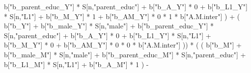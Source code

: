 \documentclass[
]{book}
\newenvironment{Shaded}{\begin{snugshade}}{\end{snugshade}}
\newcommand{\DecValTok}[1]{\textcolor[rgb]{0.00,0.00,0.81}{#1}}
\newcommand{\NormalTok}[1]{#1}
\newcommand{\SpecialCharTok}[1]{\textcolor[rgb]{0.00,0.00,0.00}{#1}}
\newcommand{\StringTok}[1]{\textcolor[rgb]{0.31,0.60,0.02}{#1}}
\begin{document}
\begin{Shaded}
\begin{Highlighting}[]
\NormalTok{                                 b[}\StringTok{"b\_parent\_educ\_Y"}\NormalTok{] }\SpecialCharTok{*}\NormalTok{ S[n,}\StringTok{"parent\_educ"}\NormalTok{] }\SpecialCharTok{+} 
\NormalTok{                                 b[}\StringTok{"b\_A\_Y"}\NormalTok{] }\SpecialCharTok{*} \DecValTok{0} \SpecialCharTok{+} 
\NormalTok{                                 b[}\StringTok{"b\_L1\_Y"}\NormalTok{] }\SpecialCharTok{*}\NormalTok{ S[n,}\StringTok{"L1"}\NormalTok{] }\SpecialCharTok{+}
\NormalTok{                                 b[}\StringTok{"b\_M\_Y"}\NormalTok{] }\SpecialCharTok{*} \DecValTok{1} \SpecialCharTok{+}
\NormalTok{                                 b[}\StringTok{"b\_AM\_Y"}\NormalTok{] }\SpecialCharTok{*} \DecValTok{0} \SpecialCharTok{*} \DecValTok{1} \SpecialCharTok{*}\NormalTok{ b[}\StringTok{"A.M.inter"}\NormalTok{] ) }\SpecialCharTok{+} 
\NormalTok{                             ( b[}\StringTok{"b\_Y"}\NormalTok{] }\SpecialCharTok{+} 
\NormalTok{                                 b[}\StringTok{"b\_male\_Y"}\NormalTok{] }\SpecialCharTok{*}\NormalTok{ S[n,}\StringTok{"male"}\NormalTok{] }\SpecialCharTok{+} 
\NormalTok{                                 b[}\StringTok{"b\_parent\_educ\_Y"}\NormalTok{] }\SpecialCharTok{*}\NormalTok{ S[n,}\StringTok{"parent\_educ"}\NormalTok{] }\SpecialCharTok{+} 
\NormalTok{                                 b[}\StringTok{"b\_A\_Y"}\NormalTok{] }\SpecialCharTok{*} \DecValTok{0} \SpecialCharTok{+} 
\NormalTok{                                 b[}\StringTok{"b\_L1\_Y"}\NormalTok{] }\SpecialCharTok{*}\NormalTok{ S[n,}\StringTok{"L1"}\NormalTok{] }\SpecialCharTok{+}
\NormalTok{                                 b[}\StringTok{"b\_M\_Y"}\NormalTok{] }\SpecialCharTok{*} \DecValTok{0} \SpecialCharTok{+}
\NormalTok{                                 b[}\StringTok{"b\_AM\_Y"}\NormalTok{] }\SpecialCharTok{*} \DecValTok{0} \SpecialCharTok{*} \DecValTok{0} \SpecialCharTok{*}\NormalTok{ b[}\StringTok{"A.M.inter"}\NormalTok{] )) }\SpecialCharTok{*}
\NormalTok{      ( ( b[}\StringTok{"b\_M"}\NormalTok{] }\SpecialCharTok{+} 
\NormalTok{            b[}\StringTok{"b\_male\_M"}\NormalTok{] }\SpecialCharTok{*}\NormalTok{ S[n,}\StringTok{"male"}\NormalTok{] }\SpecialCharTok{+} 
\NormalTok{            b[}\StringTok{"b\_parent\_educ\_M"}\NormalTok{] }\SpecialCharTok{*}\NormalTok{ S[n,}\StringTok{"parent\_educ"}\NormalTok{] }\SpecialCharTok{+} 
\NormalTok{            b[}\StringTok{"b\_L1\_M"}\NormalTok{] }\SpecialCharTok{*}\NormalTok{ S[n,}\StringTok{"L1"}\NormalTok{] }\SpecialCharTok{+}
\NormalTok{            b[}\StringTok{"b\_A\_M"}\NormalTok{] }\SpecialCharTok{*} \DecValTok{1}\NormalTok{ ) }\SpecialCharTok{{-}} 

\end{Highlighting}
\end{Shaded}
\end{document}
